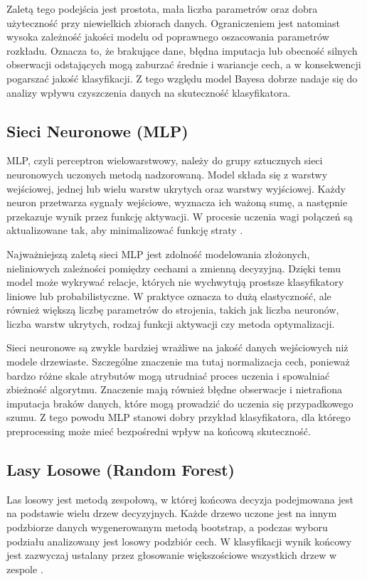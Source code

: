{Zaletą tego podejścia jest prostota, mała liczba parametrów oraz dobra użyteczność przy niewielkich zbiorach danych. Ograniczeniem jest natomiast wysoka zależność jakości modelu od poprawnego oszacowania parametrów rozkładu. Oznacza to, że brakujące dane, błędna imputacja lub obecność silnych obserwacji odstających mogą zaburzać średnie i wariancje cech, a w konsekwencji pogarszać jakość klasyfikacji. Z tego względu model Bayesa dobrze nadaje się do analizy wpływu czyszczenia danych na skuteczność klasyfikatora.

\subsection{Sieci Neuronowe (MLP)}
MLP, czyli perceptron wielowarstwowy, należy do grupy sztucznych sieci neuronowych uczonych metodą nadzorowaną. Model składa się z warstwy wejściowej, jednej lub wielu warstw ukrytych oraz warstwy wyjściowej. Każdy neuron przetwarza sygnały wejściowe, wyznacza ich ważoną sumę, a następnie przekazuje wynik przez funkcję aktywacji. W procesie uczenia wagi połączeń są aktualizowane tak, aby minimalizować funkcję straty \cite{SklearnMLPClassifier}.

Najważniejszą zaletą sieci MLP jest zdolność modelowania złożonych, nieliniowych zależności pomiędzy cechami a zmienną decyzyjną. Dzięki temu model może wykrywać relacje, których nie wychwytują prostsze klasyfikatory liniowe lub probabilistyczne. W praktyce oznacza to dużą elastyczność, ale również większą liczbę parametrów do strojenia, takich jak liczba neuronów, liczba warstw ukrytych, rodzaj funkcji aktywacji czy metoda optymalizacji.

Sieci neuronowe są zwykle bardziej wrażliwe na jakość danych wejściowych niż modele drzewiaste. Szczególne znaczenie ma tutaj normalizacja cech, ponieważ bardzo różne skale atrybutów mogą utrudniać proces uczenia i spowalniać zbieżność algorytmu. Znaczenie mają również błędne obserwacje i nietrafiona imputacja braków danych, które mogą prowadzić do uczenia się przypadkowego szumu. Z tego powodu MLP stanowi dobry przykład klasyfikatora, dla którego preprocessing może mieć bezpośredni wpływ na końcową skuteczność.

\subsection{Lasy Losowe (Random Forest)}
Las losowy jest metodą zespołową, w której końcowa decyzja podejmowana jest na podstawie wielu drzew decyzyjnych. Każde drzewo uczone jest na innym podzbiorze danych wygenerowanym metodą bootstrap, a podczas wyboru podziału analizowany jest losowy podzbiór cech. W klasyfikacji wynik końcowy jest zazwyczaj ustalany przez głosowanie większościowe wszystkich drzew w zespole \cite{SklearnRandomForest}.

}
